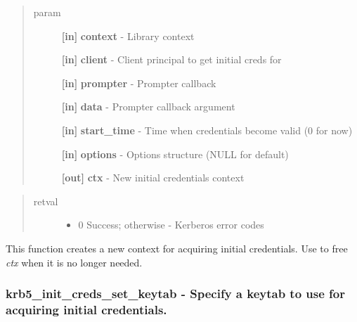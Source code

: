 \documentclass[letterpaper,10pt,english]{sphinxmanual}
\begin{document}
\begin{quote}\begin{description}
\item[{param}] \leavevmode
\textbf{{[}in{]}} \textbf{context} - Library context

\textbf{{[}in{]}} \textbf{client} - Client principal to get initial creds for

\textbf{{[}in{]}} \textbf{prompter} - Prompter callback

\textbf{{[}in{]}} \textbf{data} - Prompter callback argument

\textbf{{[}in{]}} \textbf{start\_time} - Time when credentials become valid (0 for now)

\textbf{{[}in{]}} \textbf{options} - Options structure (NULL for default)

\textbf{{[}out{]}} \textbf{ctx} - New initial credentials context

\end{description}\end{quote}
\begin{quote}\begin{description}
\item[{retval}] \leavevmode\begin{itemize}
\item {} 
0   Success; otherwise - Kerberos error codes

\end{itemize}

\end{description}\end{quote}

This function creates a new context for acquiring initial credentials. Use {\hyperref[appdev/refs/api/krb5_init_creds_free:c.krb5_init_creds_free]{}} to free \emph{ctx} when it is no longer needed.


\subsubsection{krb5\_init\_creds\_set\_keytab -  Specify a keytab to use for acquiring initial credentials.}
\label{appdev/refs/api/krb5_init_creds_set_keytab:krb5-init-creds-set-keytab-specify-a-keytab-to-use-for-acquiring-initial-credentials}\label{appdev/refs/api/krb5_init_creds_set_keytab::doc}

\begin{fulllineitems}
\label{appdev/refs/api/krb5_init_creds_set_keytab:c.krb5_init_creds_set_keytab}
\end{fulllineitems}
\end{document}

